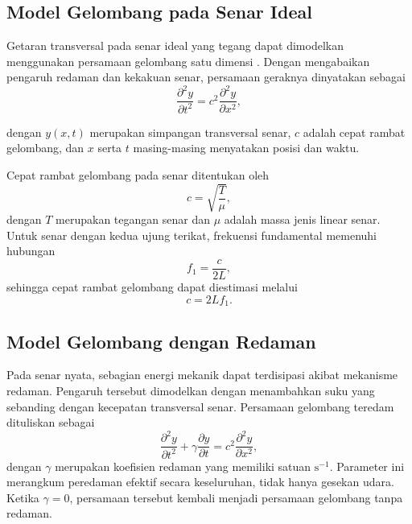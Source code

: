\documentclass[aps,prl,twocolumn,superscriptaddress]{revtex4-2}
\begin{document}
    \subsection{Model Gelombang pada Senar Ideal}

        Getaran transversal pada senar ideal yang tegang dapat dimodelkan menggunakan persamaan gelombang satu dimensi \cite{BillinghamKing2000}. 
        Dengan mengabaikan pengaruh redaman dan kekakuan senar, persamaan geraknya dinyatakan sebagai
        \begin{equation}
            \frac{\partial^2 y}{\partial t^2} = c^2 \frac{\partial^2 y}{\partial x^2},
            \label{eq:wave-equation}
        \end{equation}

        dengan $y(x,t)$ merupakan simpangan transversal senar, $c$ adalah cepat rambat gelombang, dan $x$ serta $t$ masing-masing menyatakan posisi dan waktu. 
        
        Cepat rambat gelombang pada senar ditentukan oleh
        \begin{equation}
            c = \sqrt{\frac{T}{\mu}},
            \label{eq:wave-speed}
        \end{equation}
        dengan $T$ merupakan tegangan senar dan $\mu$ adalah massa jenis linear senar.
        Untuk senar dengan kedua ujung terikat, frekuensi fundamental memenuhi hubungan
        \begin{equation}
            f_1 = \frac{c}{2L},
            \label{eq:fundamental-frequency}
        \end{equation}
        sehingga cepat rambat gelombang dapat diestimasi melalui
        \begin{equation}
            c = 2Lf_1.
            \label{eq:wave-speed-estimation}
        \end{equation}

    \subsection{Model Gelombang dengan Redaman}

        Pada senar nyata, sebagian energi mekanik dapat terdisipasi akibat mekanisme redaman. 
        Pengaruh tersebut dimodelkan dengan menambahkan suku yang sebanding dengan kecepatan transversal senar. 
        Persamaan gelombang teredam dituliskan sebagai
        \begin{equation}
            \frac{\partial^2 y}{\partial t^2} + \gamma \frac{\partial y}{\partial t} = c^2 \frac{\partial^2 y}{\partial x^2},
            \label{eq:damped-wave-equation}
        \end{equation}
        dengan $\gamma$ merupakan koefisien redaman yang memiliki satuan $\mathrm{s}^{-1}$. 
        Parameter ini merangkum peredaman efektif secara keseluruhan, tidak hanya gesekan udara.
        Ketika $\gamma=0$, persamaan tersebut kembali menjadi persamaan gelombang tanpa redaman.
\end{document}
